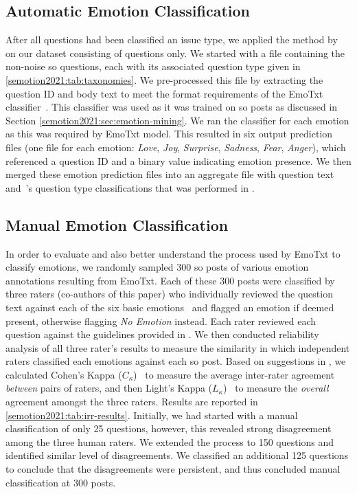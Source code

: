 \subsection{Automatic Emotion Classification}

After all questions had been classified an issue type, we applied the method by~\citet{novielli2018} on our dataset consisting of questions only.
We started with a file containing the \SEMNumTotalNonNoisePosts{} non-noise \gls{so} questions, each with its associated question type given in \cref{semotion2021:tab:taxonomies}. We pre-processed this file by extracting the question ID and body text to meet the format requirements of the EmoTxt classifier~\citep{calefato2017}. This classifier was used as it was trained on \gls{so} posts as discussed in Section \cref{semotion2021:sec:emotion-mining}. We ran the classifier for each emotion as this was required by EmoTxt model. This resulted in six output prediction files (one file for each emotion: \textit{Love}, \textit{Joy}, \textit{Surprise}, \textit{Sadness}, \textit{Fear}, \textit{Anger}), which referenced a question ID and a binary value indicating emotion presence. We then merged these emotion prediction files into an aggregate file with question text and~\citeauthor{Beyer:2018fm}'s question type classifications that was performed in \citep{Cummaudo:2020icse}.

\subsection{Manual Emotion Classification} 
\label{semotion2021:ssec:manual}
\def\cohen{$C_{\kappa}$}
\def\light{$L_{\kappa}$}

In order to evaluate and also better understand the process used by EmoTxt to classify emotions, we randomly sampled 300 \gls{so} posts of various emotion annotations resulting from EmoTxt. Each of these 300 posts were classified by three raters (co-authors of this paper) who individually reviewed the question text against each of the six basic emotions~\citep{shaver1987} and flagged an emotion if deemed present, otherwise flagging \textit{No Emotion} instead. Each rater reviewed each question against the guidelines provided in \citep{novielli2018}. We then conducted reliability analysis of all three rater's results to measure the similarity in which independent raters classified each emotions against each \gls{so} post. Based on suggestions in \cite{Hallgren:2012kt}, we calculated Cohen's Kappa (\cohen{})~\citep{Cohen:1960tf} to measure the average inter-rater agreement \textit{between} pairs of raters, and then Light's Kappa (\light{})~\citep{Light:1971vz} to measure the \textit{overall} agreement amongst the three raters. Results are reported in \cref{semotion2021:tab:irr-results}. Initially, we had started with a manual classification of only 25 questions, however, this revealed strong disagreement among the three human raters. We extended the process to 150 questions and identified similar level of disagreements. We classified an additional 125 questions to conclude that the disagreements were persistent, and thus concluded manual classification at 300 posts.

